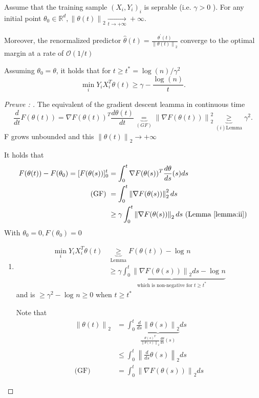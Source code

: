\begin{thm}[]
    Assume that the training sample $ (X_i, Y_i)_i $ is seprable (i.e. $ \gamma > 0 $ ). For any initial point $ \theta _0 \in \mathbb{R}^d , \left\| \theta (t) \right\| _2 \xrightarrow[t \to +\infty]{} +\infty  $. 
    
    Moreover, the renormalized predictor $ \hat{\theta}(t) = \frac{\theta ^\prime (t)}{\left\| \theta (t) \right\| _2} $ converge to the optimal margin at a rate of $ \mathcal{O }(1/t) $ 
    
    Assuming $\theta_0 = \theta $, it holds that for $t \geq t^\ast = \log(n) / \gamma ^2 $
    \[
        \min _i Y_iX_i^T \theta (t) \geq \gamma - \frac{\log_{}(n)}{t}
    .\]
\end{thm}
\begin{proof}[Preuve : ]
    The equivalent of the gradient descent leamma in continuous time 
    \[
        \frac{d}{dt} F(\theta (t)) = \nabla F(\theta (t))^T \frac{d \theta(t)}{dt} \underbrace{=}_{(GF)} \left\| \nabla F(\theta(t)) \right\|_2^2  \underbrace{\geq }_{(i) \text{Lemma}} \gamma ^2 
    .\]
    F grows unbounded and this $\left\| \theta (t) \right\|_2 \to + \infty $    

    It holds that 
    \begin{align*}
        F(\theta (t)) - F(\theta _0) = [F(\theta (s))]_0 ^t 
            &= \int_{0}^{t} \nabla F(\theta (s))^T \frac{d \theta }{ds}(s) ds \\
        \text{(GF) }
            &= \int_{0}^{t} \left\| \nabla F(\theta (s)) \right\| _2 ^2 ds \\
            &\geq \gamma \int_{0}^{t} \left\| \nabla F(\theta (s)) \right\| _2 ds \text{ (Lemma \ref{lemma:ii})}
    \end{align*}
    With $ \theta _0 = 0 , F(\theta _0) = 0 $ 
    \begin{enumerate}
        \item \begin{align*}
            \min_i Y_i X_i^T \theta (t) &\underbrace{\geq }_{\text{Lemma}} F(\theta (t)) - \log_{}n \\
            & \geq \underbrace{\gamma  \int_{0}^{t} \left\| \nabla F(\theta (s)) \right\|_2 ds - \log_{}n }_{ \text{which is non-negative for } t \geq t^\ast } 
        \end{align*}
        and is $ \geq \gamma ^2 - \log_{}n \geq 0 $ when $t \geq t^\ast $
        
        Note that 
        \begin{align*}
            \left\| \theta (t) \right\| _2 &= \int_{0}^{t} \underbrace{\frac{d}{ds}\left\| \theta (s) \right\| _2}_{\frac{\theta (s) ^T}{\left\| \theta (s) \right\| _2 } \frac{d \theta }{ds}(s) } ds \\
                &\leq \int_{0}^{t} \left\| \frac{d}{ds} \theta (s) \right\| _2 ds \\
            \text{(GF) } &= \int_{0}^{t} \left\| \nabla F(\theta (s)) \right\| _2 ds
        \end{align*}
        

\end{enumerate}
\end{proof}
